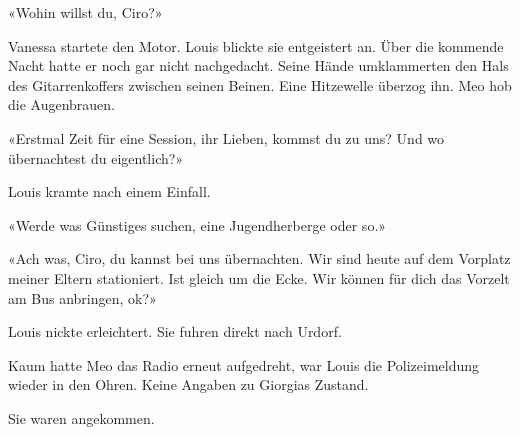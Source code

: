 «Wohin willst du, Ciro?»

Vanessa startete den Motor.
Louis blickte sie entgeistert an. Über die kommende Nacht hatte er noch
gar nicht nachgedacht. Seine Hände umklammerten den Hals des
Gitarrenkoffers zwischen seinen Beinen. Eine Hitzewelle überzog ihn.
Meo hob die Augenbrauen.

«Erstmal Zeit für eine Session, ihr Lieben, kommst du zu uns? Und wo
übernachtest du eigentlich?»

Louis kramte nach einem Einfall.

«Werde was Günstiges suchen, eine Jugendherberge oder so.»

«Ach was, Ciro, du kannst bei uns übernachten. Wir sind heute auf dem
Vorplatz meiner Eltern stationiert. Ist gleich um die Ecke. Wir können
für dich das Vorzelt am Bus anbringen, ok?» 

Louis nickte erleichtert. Sie fuhren direkt nach Urdorf.

Kaum hatte Meo das Radio erneut aufgedreht, war Louis die Polizeimeldung
wieder in den Ohren. Keine Angaben zu Giorgias Zustand.

Sie waren angekommen.
